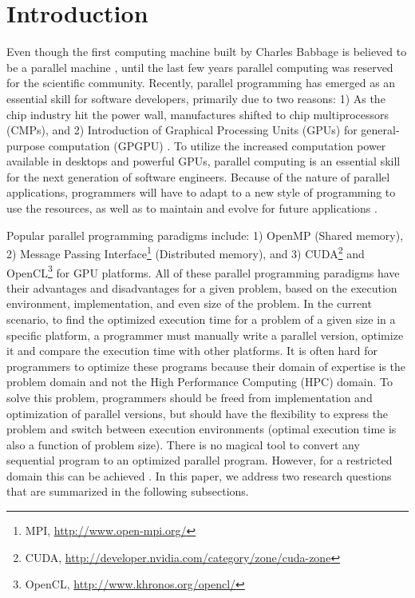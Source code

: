 \documentclass[draftclsnofoot]{elsarticle}
\begin{document}

\section{Introduction} 
Even though the first computing machine built by Charles Babbage  is believed to be a parallel machine \cite{babage}, until the last few years parallel
computing was reserved for the scientific community. Recently, parallel programming has emerged as an essential skill for software developers, primarily due to
two reasons: 1) As the chip industry hit the power wall, manufactures shifted to chip multiprocessors  (CMPs), and 2) Introduction of 
Graphical Processing Units (GPUs) for general-purpose computation (GPGPU) \cite{gpgpu}.  To utilize the increased computation power available in desktops 
and powerful GPUs, parallel computing is an essential skill for the next generation of software engineers.
Because of the nature of parallel applications, programmers will have to adapt to a new style of programming to use the resources, as well as to maintain and evolve
for future applications \cite{comparison}.

Popular parallel programming paradigms include: 1) OpenMP \cite{openmp} (Shared memory), 2) Message Passing Interface\footnote{MPI, 
\url{http://www.open-mpi.org/}} (Distributed memory), and 3) CUDA\footnote{CUDA, \url{http://developer.nvidia.com/category/zone/cuda-zone}} and 
OpenCL\footnote{OpenCL, \url{http://www.khronos.org/opencl/}} for GPU platforms. All of these parallel programming paradigms have their advantages and disadvantages
for a given problem, based on the execution environment, implementation, and even size of the problem.  
In the current scenario, to find the optimized execution time for a problem of a given size in a specific platform, a programmer must manually write a parallel version, 
optimize it and compare the execution time with other platforms. It is often hard for programmers to optimize these programs because their domain of expertise is the problem domain
and not the High Performance Computing (HPC) domain. To solve this problem, programmers should be freed from implementation and optimization of parallel versions, but should have
the flexibility to express the problem and switch between execution environments (optimal execution time is also a function of problem size). There is 
no magical tool to convert any sequential program to an optimized parallel program. However, for a restricted domain this can be achieved \cite{liszt,trilinos,spiral}. In this paper, 
we address two research questions that are summarized in the following subsections.
\end{document}
